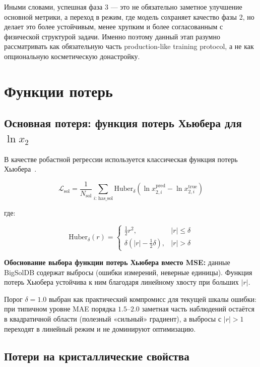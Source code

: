 \documentclass[11pt]{article}
\begin{document}
Иными словами, успешная фаза 3 --- это не обязательно заметное улучшение основной метрики, а переход в режим, где модель сохраняет качество фазы 2, но делает это более устойчивым, менее хрупким и более согласованным с физической структурой задачи. Именно поэтому данный этап разумно рассматривать как обязательную часть production-like training protocol, а не как опциональную косметическую донастройку.

\section{Функции потерь}

\subsection{Основная потеря: функция потерь Хьюбера для $\ln x_2$}

В качестве робастной регрессии используется классическая функция потерь Хьюбера~\cite{huber1964}.

\begin{equation*}
\mathcal{L}_{\mathrm{sol}} = \frac{1}{N_{\mathrm{sol}}} \sum_{i:\, \mathrm{has\_sol}} \mathrm{Huber}_\delta\!\left(\ln x_{2,i}^{\mathrm{pred}} - \ln x_{2,i}^{\mathrm{true}}\right)
\end{equation*}

где:

\begin{equation*}
\mathrm{Huber}_\delta(r) = \begin{cases} \frac{1}{2}r^2, & |r| \leq \delta \\ \delta\!\left(|r| - \frac{1}{2}\delta\right), & |r| > \delta \end{cases}
\end{equation*}

\textbf{Обоснование выбора функции потерь Хьюбера вместо MSE:} данные BigSolDB содержат выбросы (ошибки измерений, неверные единицы). Функция потерь Хьюбера устойчива к ним благодаря линейному хвосту при больших $|r|$.

Порог $\delta=1.0$ выбран как практический компромисс для текущей шкалы ошибки: при типичном уровне MAE порядка $1.5$--$2.0$ заметная часть наблюдений остаётся в квадратичной области (полезный «сильный» градиент), а выбросы с $|r|>1$ переходят в линейный режим и не доминируют оптимизацию.

\subsection{Потери на кристаллические свойства}
\end{document}
